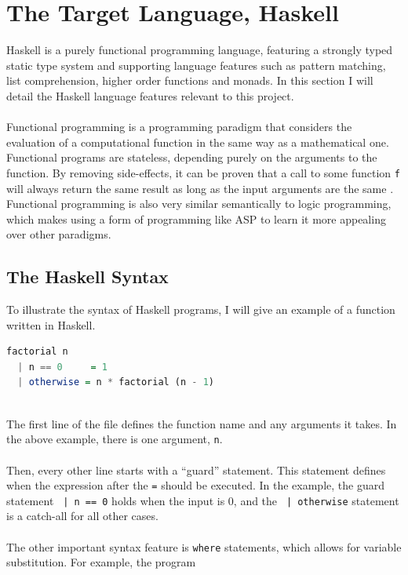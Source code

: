 \section{The Target Language, Haskell}
Haskell \cite{Hudak2007} is a purely functional programming language, featuring a strongly typed static type system and supporting language features such as pattern matching, list comprehension, higher order functions and monads. In this section I will detail the Haskell language features relevant to this project. \\ \\
Functional programming is a programming paradigm that considers the evaluation of a computational function in the same way as a mathematical one. Functional programs are stateless, depending purely on the arguments to the function. By removing side-effects, it can be proven that a call to some function \lstinline!f! will always return the same result as long as the input arguments are the same \cite{Company2008}. Functional programming is also very similar semantically to logic programming, which makes using a form of programming like ASP to learn it more appealing over other paradigms.

\subsection{The Haskell Syntax}
To illustrate the syntax of Haskell programs, I will give an example of a function written in Haskell.

\begin{lstlisting}[language = Haskell]
factorial n
  | n == 0     = 1
  | otherwise = n * factorial (n - 1)
\end{lstlisting}
\mbox{} \\
The first line of the file defines the function name and any arguments it takes. In the above example, there is one argument, \lstinline!n!. \\ \\
Then, every other line starts with a ``guard'' statement. This statement defines when the expression after the \lstinline!=! should be executed. In the example, the guard statement \lstinline! | n == 0! holds when the input is 0, and the \lstinline! | otherwise! statement is a catch-all for all other cases. \\ \\
The other important syntax feature is \lstinline!where! statements, which allows for variable substitution. For example, the program \\

